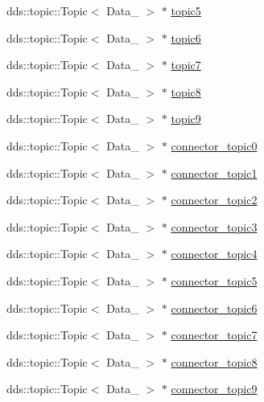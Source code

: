 \begin{DoxyCompactItemize}
\item 
dds\+::topic\+::\+Topic$<$ Data\+\_ $>$ $\ast$ \hyperlink{classFactory_a81ba9f3ce496974146df61fb932a64e1}{topic5}
\item 
dds\+::topic\+::\+Topic$<$ Data\+\_ $>$ $\ast$ \hyperlink{classFactory_a9ead1fa2f7352def150a5789f7c47b33}{topic6}
\item 
dds\+::topic\+::\+Topic$<$ Data\+\_ $>$ $\ast$ \hyperlink{classFactory_af496c7d2b15f70cd42cfe0ce20e0656c}{topic7}
\item 
dds\+::topic\+::\+Topic$<$ Data\+\_ $>$ $\ast$ \hyperlink{classFactory_a9357b99e6b5b07bb4115b854010873fd}{topic8}
\item 
dds\+::topic\+::\+Topic$<$ Data\+\_ $>$ $\ast$ \hyperlink{classFactory_a6f4d710cdaab90dc87a0fff6cd3a34bc}{topic9}
\item 
dds\+::topic\+::\+Topic$<$ Data\+\_ $>$ $\ast$ \hyperlink{classFactory_a292d6100f4cee20be6f5f7b5f1ed13b5}{connector\+\_\+topic0}
\item 
dds\+::topic\+::\+Topic$<$ Data\+\_ $>$ $\ast$ \hyperlink{classFactory_a744afdb2e49dc636774fdd4a2f6ec2d1}{connector\+\_\+topic1}
\item 
dds\+::topic\+::\+Topic$<$ Data\+\_ $>$ $\ast$ \hyperlink{classFactory_ac7074f7a4d429bacd720150a248dc0e3}{connector\+\_\+topic2}
\item 
dds\+::topic\+::\+Topic$<$ Data\+\_ $>$ $\ast$ \hyperlink{classFactory_a637aec1cd43fdfb430f59858e6408a6e}{connector\+\_\+topic3}
\item 
dds\+::topic\+::\+Topic$<$ Data\+\_ $>$ $\ast$ \hyperlink{classFactory_a89e5876a2d5f8d4c48fe48023450a8cc}{connector\+\_\+topic4}
\item 
dds\+::topic\+::\+Topic$<$ Data\+\_ $>$ $\ast$ \hyperlink{classFactory_abb59b6717eb779f8cf2dfdab552319cc}{connector\+\_\+topic5}
\item 
dds\+::topic\+::\+Topic$<$ Data\+\_ $>$ $\ast$ \hyperlink{classFactory_a92c01f1de5c207d812509de1ca687bea}{connector\+\_\+topic6}
\item 
dds\+::topic\+::\+Topic$<$ Data\+\_ $>$ $\ast$ \hyperlink{classFactory_a40529b00720b7f40615b07d0fb2265b3}{connector\+\_\+topic7}
\item 
dds\+::topic\+::\+Topic$<$ Data\+\_ $>$ $\ast$ \hyperlink{classFactory_a567cf4a6f03c8dd9be6cf26f6fd277d5}{connector\+\_\+topic8}
\item 
dds\+::topic\+::\+Topic$<$ Data\+\_ $>$ $\ast$ \hyperlink{classFactory_adffa083b38163d0e5b912250cb27cb58}{connector\+\_\+topic9}

\end{DoxyCompactItemize}
